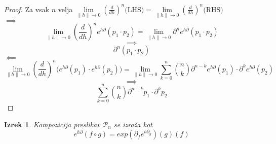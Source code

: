 \documentclass{article}
\newcommand{\dP}{\mathcal{P}}
\newcommand{\D}{\partial}
\newtheorem{izrek}{Izrek}[section]
\begin{document}
 \begin{proof}
 Za vsak $n$ velja $\lim\limits_{\lVert h\rVert\to 0}(\frac{d}{dh})^n\text{(LHS)}=\lim\limits_{\lVert h\rVert\to 0}(\frac{d}{dh})^n\text{(RHS)}$\\
  $\implies$
  $$\lim\limits_{\lVert h\rVert\to 0}(\frac{d}{dh})^ne^{h\D}(p_1\cdot p_2)=\lim\limits_{\lVert h\rVert\to 0}\D^ne^{h\D}(p_1\cdot p_2)$$
  $$\implies$$
  $$\D^n(p_1\cdot p_2)$$
  $\impliedby$
  $$\lim\limits_{\lVert h\rVert\to 0}(\frac{d}{dh})^n\Big(e^{h\D}(p_1)\cdot e^{h\D}(p_2)\Big)=\lim\limits_{\lVert h\rVert\to 0}\sum\limits_{k=0}^{n}{n\choose k}\D^{n-k}e^{h\D}(p_1)\cdot \D^ke^{h\D}(p_2)$$
  $$\implies$$
  $$\sum\limits_{k=0}^{n}{n\choose k}\D^{n-k}p_1\cdot \D^kp_2$$
 \end{proof}
 
 \begin{izrek}\label{izr:kompo}
 Kompozicija preslikav $\dP_n$ se izraža kot
 \begin{equation}
 e^{h\D}(f\circ g)=exp(\D_fe^{h\D_g})(g)(f)
 \end{equation}
 \end{izrek}
 
\end{document}
